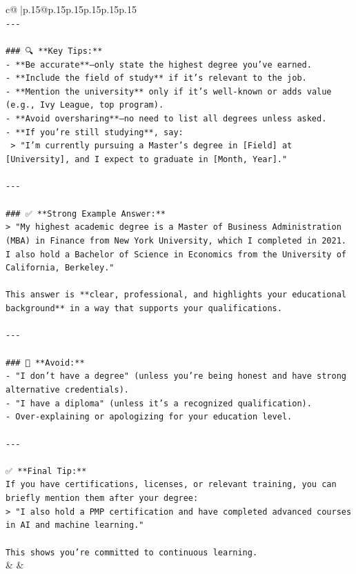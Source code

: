 \documentclass{article}
\begin{document}
{\begin{supertabular}{c@{$\;$}|p{.15\linewidth}@{}p{.15\linewidth}p{.15\linewidth}p{.15\linewidth}p{.15\linewidth}p{.15\linewidth}}
{{{\\ 
\texttt{{-}{-}{-}} \\
\\ 
\texttt{\#\#\# 🔍 **Key Tips:**} \\
\texttt{{-} **Be accurate**—only state the highest degree you’ve earned.} \\
\texttt{{-} **Include the field of study** if it’s relevant to the job.} \\
\texttt{{-} **Mention the university** only if it’s well{-}known or adds value (e.g., Ivy League, top program).} \\
\texttt{{-} **Avoid oversharing**—no need to list all degrees unless asked.} \\
\texttt{{-} **If you’re still studying**, say:  } \\
\texttt{  > "I’m currently pursuing a Master’s degree in {[}Field{]} at {[}University{]}, and I expect to graduate in {[}Month, Year{]}."} \\
\\ 
\texttt{{-}{-}{-}} \\
\\ 
\texttt{\#\#\# ✅ **Strong Example Answer:**} \\
\texttt{> "My highest academic degree is a Master of Business Administration (MBA) in Finance from New York University, which I completed in 2021. I also hold a Bachelor of Science in Economics from the University of California, Berkeley."} \\
\\ 
\texttt{This answer is **clear, professional, and highlights your educational background** in a way that supports your qualifications.} \\
\\ 
\texttt{{-}{-}{-}} \\
\\ 
\texttt{\#\#\# 🚫 **Avoid:**} \\
\texttt{{-} "I don’t have a degree" (unless you’re being honest and have strong alternative credentials).} \\
\texttt{{-} "I have a diploma" (unless it’s a recognized qualification).} \\
\texttt{{-} Over{-}explaining or apologizing for your education level.} \\
\\ 
\texttt{{-}{-}{-}} \\
\\ 
\texttt{✅ **Final Tip:**  } \\
\texttt{If you have certifications, licenses, or relevant training, you can briefly mention them after your degree:  } \\
\texttt{> "I also hold a PMP certification and have completed advanced courses in AI and machine learning."} \\
\\ 
\texttt{This shows you’re committed to continuous learning.} \\
            }
        }
    }
    & & \\ \\


\end{supertabular}}
\end{document}
